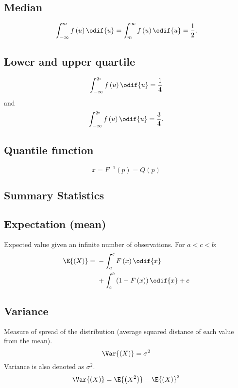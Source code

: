 \documentclass{article}
\begin{document}
\begin{multicols}{3}
    \subsection{Median}
    \begin{equation*}
        \int_{-\infty}^m f\left( u \right) \odif{u} = \int^{\infty}_m f\left( u \right) \odif{u} = \frac{1}{2}.
    \end{equation*}
    \subsection{Lower and upper quartile}
    \begin{equation*}
        \int_{-\infty}^{q_1} f\left( u \right) \odif{u} = \frac{1}{4}
    \end{equation*}
    and
    \begin{equation*}
        \int_{-\infty}^{q_2} f\left( u \right) \odif{u} = \frac{3}{4}.
    \end{equation*}
    \subsection{Quantile function}
    \begin{equation*}
        x = F^{-1}\left( p \right) = Q\left( p \right)
    \end{equation*}
    \subsection{Summary Statistics}
    \subsection{Expectation (mean)}
    Expected value given an infinite number of observations. For \(a < c < b\):
    \begin{equation*}
        \E{\left(X\right)} = \begin{aligned}[t]
             & -\int_{a}^c F\left( x \right) \odif{x}                     \\
             & + \int_c^b \left(1 - F\left( x \right)\right) \odif{x} + c
        \end{aligned}
    \end{equation*}
    \subsection{Variance}
    Measure of spread of the distribution (average squared distance of each value from the mean).
    \begin{equation*}
        \Var{\left( X \right)} = \sigma^2
    \end{equation*}
    Variance is also denoted as \(\sigma^2\).
    \begin{equation*}
        \Var{\left( X \right)} = \E{\left( X^2 \right)} - \E{\left( X \right)}^2
    \end{equation*}

\end{multicols}
\end{document}
